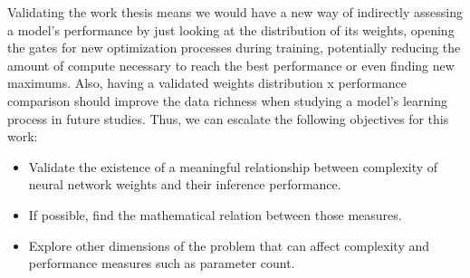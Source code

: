     Validating the work thesis means we would have a new way of indirectly assessing a model's performance by just looking at the distribution of its weights, opening the gates for new optimization processes during training, potentially reducing the amount of compute necessary to reach the best performance or even finding new maximums. Also, having a validated weights distribution x performance comparison should improve the data richness when studying a model's learning process in future studies. Thus, we can escalate the following objectives for this work:
    \begin{itemize}
        \item Validate the existence of a meaningful relationship between complexity of neural network weights and their inference performance.
        \item If possible, find the mathematical relation between those measures.
        \item Explore other dimensions of the problem that can affect complexity and performance measures such as parameter count.
    \end{itemize}
